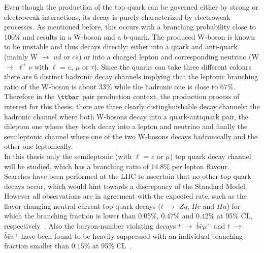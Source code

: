 Even though the production of the top quark can be governed either by strong or electroweak interactions, its decay is purely characterized by electroweak processes. As mentioned before, this occurs with a branching probability close to $100\%$ and results in a W-boson and a b-quark. 
The produced W-boson is known to be unstable and thus decays directly: either into a quark and anti-quark (mainly W $\rightarrow$ $u\bar{d}$ or $c\bar{s}$) or into a charged lepton and corresponding neutrino (W $\rightarrow$ $\ell^{+}\nu$ with $\ell$ = $e$, $\mu$ or $\tau$).
Since the quarks can take three different colours there are 6 distinct hadronic decay channels implying that the leptonic branching ratio of the W-boson is about $33\%$ while the hadronic one is close to $67\%$. %
\\
Therefore in the $\ttbar$ pair production context, the production process of interest for this thesis, there are three clearly distinghuishable decay channels: the hadronic channel where both W-bosons decay into a quark-antiquark pair, the dilepton one where they both decay into a lepton and neutrino and finally the semileptonic channel where one of the two W-bosons decays hadronically and the other one leptonically. 
\\
In this thesis only the semileptonic (with $\ell$ = $e$ or $\mu$) top quark decay channel will be studied, which has a branching ratio of $14.8\%$ per lepton flavour.
\\

Searches have been performed at the LHC to ascertain that no other top quark decays occur, which would hint towards a discrepancy of the Standard Model. However all observations are in agreement with the expected rate, such as the flavor-changing neutral current top quark decays ($t$ $\rightarrow$ $Zq$, $Hc$ and $Hu$) for which the branching fraction is lower than 0.05$\%$, $0.47\%$ and $0.42\%$ at 95$\%$ CL, respectively~\cite{CMStZqDecayBR, CMStHqDecayBR}. Also the baryon-number violating decays $t$ $\rightarrow$ $\bar{b}\bar{c}\mu^{+}$ and $t$ $\rightarrow$ $\bar{b}\bar{u} e^{+}$ have been found to be heavily suppressed with an individual branching fraction smaller than $0.15\%$ at 95\% CL~\cite{CMSBNVDecayBR}.
\\

